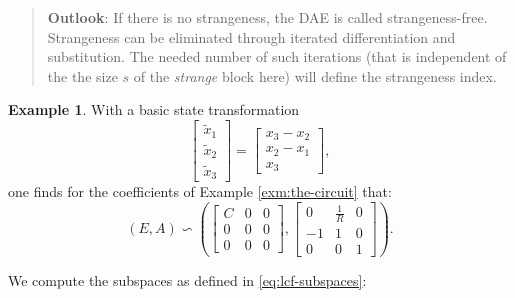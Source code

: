 \documentclass[]{book}
\newenvironment {JHSAYS} [0] {\begin{quote}\color{jhsc}} {\end{quote}}
\theoremstyle{definition}
\theoremstyle{definition}
\newtheorem{example}{Example}[chapter]
\theoremstyle{definition}
\theoremstyle{definition}
\theoremstyle{remark}
\begin{document}
\begin{JHSAYS}
\textbf{Outlook}: If there is no strangeness, the DAE is called
strangeness-free. Strangeness can be eliminated through iterated
differentiation and substitution. The needed number of such iterations
(that is independent of the the size \(s\) of the \emph{strange} block
here) will define the strangeness index.
\end{JHSAYS}

\begin{example}
\protect\hypertarget{exm:strangeness-in-the-circuit}{}{\label{exm:strangeness-in-the-circuit} }With a basic state transformation
\[
\begin{bmatrix}
\tilde x_1 \\ \tilde x_2 \\ \tilde x_3
\end{bmatrix}
= 
\begin{bmatrix}
x_3 - x_2 \\ x_2-x_1 \\ x_3
\end{bmatrix},
\]
one finds for the coefficients of Example \ref{exm:the-circuit} that:
\[
(E, A) \backsim 
\left(
\begin{bmatrix} C & 0 & 0 \\ 0 & 0 &0 \\ 0 & 0 &0  \end{bmatrix}
,
\begin{bmatrix} 0 & \frac{1}{R} & 0 \\ -1 & 1 & 0 \\ 0 & 0 & 1 \end{bmatrix}
\right).
\]

We compute the subspaces as defined in \eqref{eq:lcf-subspaces}:


\end{example}
\end{document}
